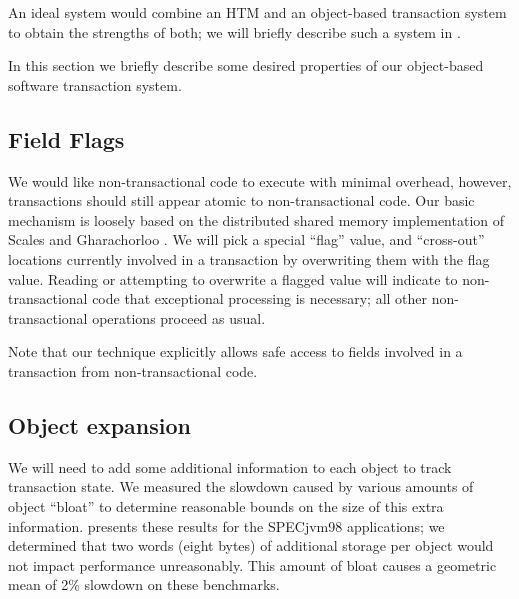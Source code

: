 \documentclass{csa-sig-alternate}
\begin{document}
An ideal system would combine an HTM and an object-based
transaction system to obtain the strengths of both; we will briefly
describe such a system in .

In this section we briefly describe some desired properties of our
object-based software transaction system.

\subsection{Field Flags}\label{sec:flagfield}
We would like non-transactional code to execute with minimal overhead,
however, transactions should still appear atomic to non-transactional
code.  Our basic mechanism is loosely based on the
distributed shared memory implementation of Scales and Gharachorloo
\cite{ScalesGh97}.  We will pick a special ``flag'' value, and
``cross-out'' locations currently involved in a transaction by
overwriting them with the flag value.  Reading or attempting to
overwrite a flagged value will indicate to non-transactional code
that exceptional processing is necessary; all other non-transactional
operations proceed as usual.

Note that our technique explicitly allows safe access to fields
involved in a transaction from non-transactional code.

\subsection{Object expansion}
We will need to add some additional information to each object to
track transaction state.  We measured the slowdown caused by various
amounts of object ``bloat'' to determine reasonable bounds on the
size of this extra information.   presents these
results for the SPECjvm98 applications; we determined that two words
(eight bytes) of additional storage per object would not impact
performance unreasonably.  This amount of bloat causes a geometric
mean of 2\% slowdown on these benchmarks.
\end{document}
